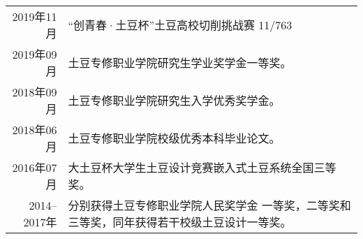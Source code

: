 


\begin{tabular}{rl}	
	2019年11月  & “创青春·土豆杯”土豆高校切削挑战赛 11/763 \\
	2019年09月  & 土豆专修职业学院研究生学业奖学金一等奖。 \\ 
	2018年09月  & 土豆专修职业学院研究生入学优秀奖学金。 \\
	2018年06月  & 土豆专修职业学院校级优秀本科毕业论文。 \\
	2016年07月  & 大土豆杯大学生土豆设计竞赛嵌入式土豆系统全国三等奖。 \\
	2014--2017年 & 分别获得土豆专修职业学院人民奖学金 一等奖，二等奖和三等奖，同年获得若干校级土豆设计一等奖。
\end{tabular}

